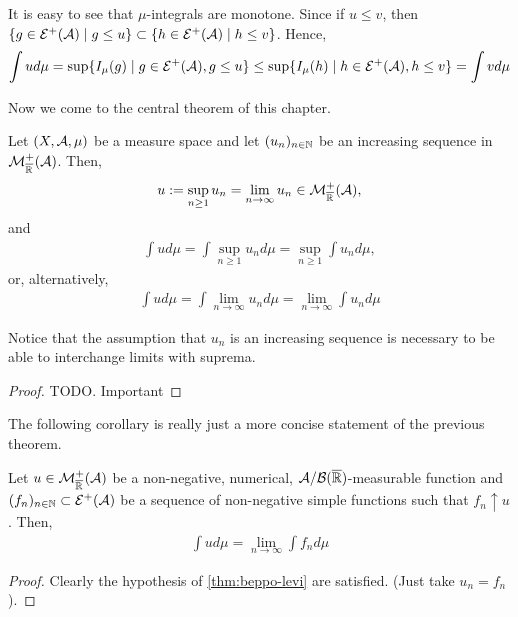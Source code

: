 \begin{remark}
	\label{rem:mu-integrals-monotone}
	It is easy to see that $\mu$-integrals are monotone. Since if $u \leq v$, then $\{g \in \mathcal{E}^+(\mathcal{A}) \mid g \leq u\} \subset \{h \in \mathcal{E}^+(\mathcal{A}) \mid h \leq v\}$. Hence,
	\begin{align*}
		\int u d\mu = \sup \{I_\mu(g) \mid g \in \mathcal{E}^+(\mathcal{A}), g \leq u\} \leq \sup \{I_\mu(h) \mid h \in \mathcal{E}^+(\mathcal{A}), h \leq v\} = \int v d\mu
	\end{align*}
\end{remark}

Now we come to the central theorem of this chapter.

\begin{thm}
	\label{thm:beppo-levi}
	Let $(X, \mathcal{A}, \mu)$ be a measure space and let $(u_n)_{n\in\mathbb{N}}$ be an increasing sequence in $\mathcal{M}^+_{\overline{\mathbb{R}}}(\mathcal{A})$. Then,
	\begin{align*}
		u := \sup_{n \geq 1} u_n = \lim_{n \to \infty} u_n \in \mathcal{M}_{\overline{\mathbb{R}}}^+(\mathcal{A}),
	\end{align*}
	and
	\begin{align}
		\int u d\mu = \int \sup_{n \geq 1} u_n d\mu = \sup_{n \geq 1} \int u_n d\mu,
	\end{align}
	or, alternatively,
	\begin{align}
		\int u d\mu = \int \lim_{n \to \infty} u_n d\mu = \lim_{n \to \infty} \int u_n d\mu
	\end{align}
\end{thm}

Notice that the assumption that $u_n$ is an increasing sequence is necessary to be able to interchange limits with suprema.

\begin{proof}
	TODO. Important
\end{proof}

The following corollary is really just a more concise statement of the previous theorem.
\begin{cor}
	\label{cor:beppo-levi}
	Let $u \in \mathcal{M}_{\overline{\mathbb{R}}}^+(\mathcal{A})$ be a non-negative, numerical, $\mathcal{A}/\mathcal{B}({\overline{\mathbb{R}}})$-measurable function and $(f_n)_{n\in\mathbb{N}} \subset \mathcal{E}^+(\mathcal{A})$ be a sequence of non-negative simple functions such that $f_n \uparrow u$. Then,
	\begin{align}
		\int u d\mu = \lim_{n \to \infty} \int f_n d\mu
	\end{align}
\end{cor}

\begin{proof}
	Clearly the hypothesis of \autoref{thm:beppo-levi} are satisfied. (Just take $u_n = f_n$).
\end{proof}

